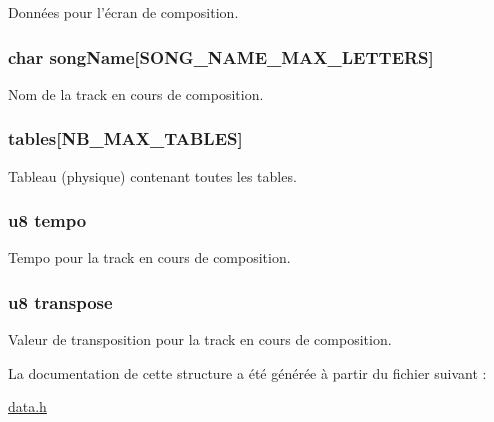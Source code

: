 \label{struct_f_a_t_a5295928ddfd03f71d0fe60e2877b253a}
Données pour l'écran de composition. \hypertarget{struct_f_a_t_a21b7fa961fccb52ae1decc3ab2fe9bd5}{
\subsubsection[{songName}]{\setlength{\rightskip}{0pt plus 5cm}char {\bf songName}\mbox{[}SONG\_\-NAME\_\-MAX\_\-LETTERS\mbox{]}}}
\label{struct_f_a_t_a21b7fa961fccb52ae1decc3ab2fe9bd5}
Nom de la track en cours de composition. \hypertarget{struct_f_a_t_ae51db5320b24fb28d769019f35c2051f}{
\subsubsection[{tables}]{ {\bf tables}\mbox{[}NB\_\-MAX\_\-TABLES\mbox{]}}}
\label{struct_f_a_t_ae51db5320b24fb28d769019f35c2051f}
Tableau (physique) contenant toutes les tables. \hypertarget{struct_f_a_t_a818a64490682a41a13e442b417bcb459}{
\subsubsection[{tempo}]{\setlength{\rightskip}{0pt plus 5cm}u8 {\bf tempo}}}
\label{struct_f_a_t_a818a64490682a41a13e442b417bcb459}
Tempo pour la track en cours de composition. \hypertarget{struct_f_a_t_a841401a367ef1cd53370b5c66363bdc9}{
\subsubsection[{transpose}]{\setlength{\rightskip}{0pt plus 5cm}u8 {\bf transpose}}}
\label{struct_f_a_t_a841401a367ef1cd53370b5c66363bdc9}
Valeur de transposition pour la track en cours de composition. 

La documentation de cette structure a été générée à partir du fichier suivant :\begin{DoxyCompactItemize}
\item 
\hyperlink{data_8h}{data.h}\end{DoxyCompactItemize}
